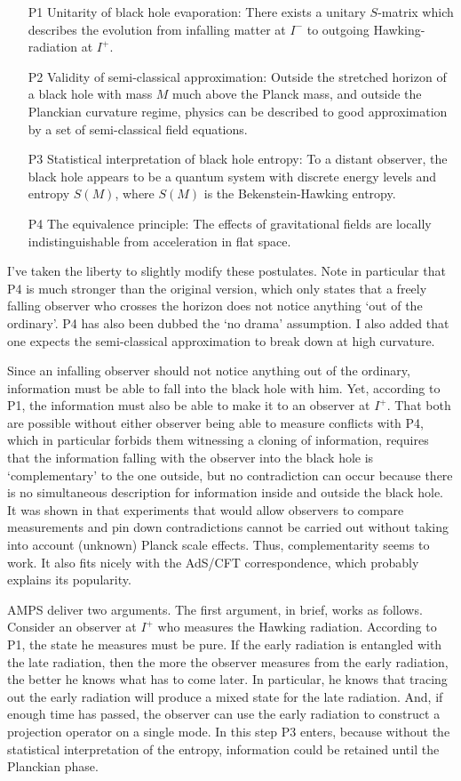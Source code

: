 \documentclass[12pt]{article}
\begin{document}
\begin{itemize}
\item[P1] Unitarity of black hole evaporation: There exists a unitary $S$-matrix which describes
the evolution from infalling matter at $I^-$ to outgoing Hawking-radiation at $I^+$.
\item[P2] Validity of semi-classical approximation: Outside the stretched horizon of a black hole with 
mass $M$ much above the Planck mass, and outside the Planckian curvature regime, physics
can be described to good approximation by a set of semi-classical field equations.
\item[P3] Statistical interpretation of black hole entropy: To a distant observer, the black hole
appears to be a quantum system with discrete energy levels and entropy $S(M)$, where $S(M)$ is the Bekenstein-Hawking entropy.
\item[P4] The equivalence principle: The effects of gravitational fields are locally indistinguishable from acceleration in flat space.
\end{itemize}

I've taken the liberty to slightly modify these postulates. Note in particular that P4 is much stronger
than the original version, which only states that a freely falling observer who crosses the horizon
does not notice anything `out of the ordinary'. P4 has also been dubbed the `no drama' assumption.
I also added that one expects the semi-classical approximation to break down at high
curvature.

Since an infalling observer should not notice anything out of the ordinary, information must be
able to fall into the black hole with him. Yet, according to P1, the information must also 
be able to make it to an observer at $I^+$. That both are possible without either observer being able to measure
conflicts with P4, which in particular forbids them witnessing a cloning of information, requires that the information 
falling with the observer into the black hole is
`complementary' to the one outside, but no contradiction can occur because there is no simultaneous
description for information inside and outside the black hole. It was shown in \cite{Susskind:1993mu}
that experiments that would allow observers to compare measurements and pin down contradictions 
cannot be carried out without taking into account (unknown) Planck scale effects. Thus, complementarity
seems to work. It also fits nicely with the AdS/CFT correspondence, which probably explains its
popularity.

{\sc AMPS} deliver two arguments. The first argument, in brief, works as follows. Consider an 
observer at $I^+$ who measures the
Hawking radiation. According to P1, the state he measures must be pure. If the early radiation is entangled
with the late radiation, then the more the observer measures from the early radiation, the better
he knows what has to come later. In particular, he knows that tracing out the early radiation will
produce a mixed state for the late radiation. And, if enough time has passed, the observer can 
use the early radiation to construct
a projection operator on a single mode. In this step P3 enters, because without the statistical
interpretation of the entropy, information could be retained until the Planckian phase. 
\end{document}
